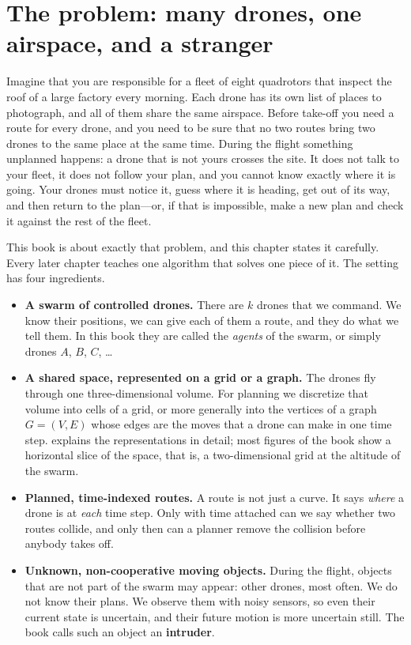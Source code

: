 \section{The problem: many drones, one airspace, and a stranger}
\label{sec:ch01-problem}

Imagine that you are responsible for a fleet of eight quadrotors that inspect the
roof of a large factory every morning. Each drone has its own list of places to
photograph, and all of them share the same airspace. Before take-off you need a route
for every drone, and you need to be sure that no two routes bring two drones to the
same place at the same time. During the flight something unplanned happens: a drone
that is not yours crosses the site. It does not talk to your fleet, it does not follow
your plan, and you cannot know exactly where it is going. Your drones must notice it,
guess where it is heading, get out of its way, and then return to the plan---or, if
that is impossible, make a new plan and check it against the rest of the fleet.

This book is about exactly that problem, and this chapter states it carefully. Every
later chapter teaches one algorithm that solves one piece of it. The setting has four
ingredients.
\begin{itemize}
  \item \textbf{A swarm of controlled drones.}
        There are $k$ drones that we command. We know their positions, we can give each
        of them a route, and they do what we tell them. In this book they are called
        the \emph{agents} of the swarm, or simply drones $A$, $B$, $C$, \dots
  \item \textbf{A shared space, represented on a grid or a graph.}
        The drones fly through one three-dimensional volume. For planning we
        discretize that volume into cells of a grid, or more generally into the
        vertices of a graph $G=(V,E)$ whose edges are the moves that a drone can make in
        one time step.  explains the representations in detail; most
        figures of the book show a horizontal slice of the space, that is, a
        two-dimensional grid at the altitude of the swarm.
  \item \textbf{Planned, time-indexed routes.}
        A route is not just a curve. It says \emph{where} a drone is at \emph{each}
        time step. Only with time attached can we say whether two routes collide, and
        only then can a planner remove the collision before anybody takes off.
  \item \textbf{Unknown, non-cooperative moving objects.}
        During the flight, objects that are not part of the swarm may appear: other
        drones, most often. We do not know their plans. We observe them with noisy
        sensors, so even their current state is uncertain, and their future motion is
        more uncertain still. The book calls such an object an \textbf{intruder}.
\end{itemize}

